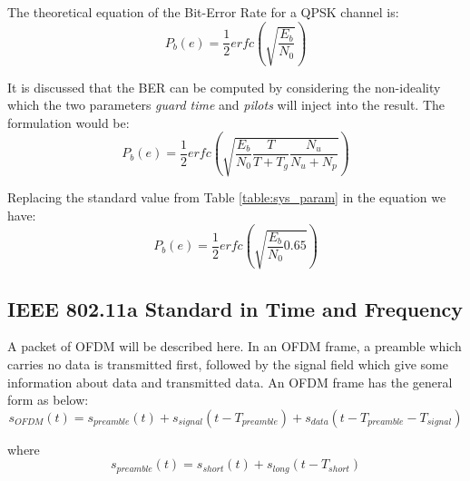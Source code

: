 The theoretical equation of the Bit-Error Rate for a QPSK channel is:\\

\begin{equation} \label{theo_ber}
P_{b}(e)= \dfrac{1}{2}erfc(\sqrt{\dfrac{E_{b}}{N_{0}}})
\end{equation}

It is discussed that the BER can be computed by considering the non-ideality which the two parameters \textit{guard time} and \textit{pilots} will inject into the result. The formulation would be:\\

\begin{equation} \label{theo_ber_guard_pilot}
P_{b}(e)= \dfrac{1}{2}erfc(\sqrt{\dfrac{E_{b}}{N_{0}}\dfrac{T}{T+T_{g}}\dfrac{N_{u}}{N_{u}+N_{p}}})
\end{equation}

Replacing the standard value from Table \ref{table:sys_param} in the equation we have:\\

\begin{equation} \label{theo_ber_ieee}
P_{b}(e)= \dfrac{1}{2}erfc(\sqrt{\dfrac{E_{b}}{N_{0}}0.65})
\end{equation}

\subsection{IEEE 802.11a Standard in Time and Frequency}
\label{section:ieee_standard}
A packet of OFDM will be described here. In an OFDM frame, a preamble which carries no data is transmitted first, followed by the signal field which give some information about data and transmitted data. An OFDM frame has the general form as below:
\begin{equation} \label{sym_ofdm}
s_{OFDM}(t)= s_{preamble}(t)+ s_{signal}(t- T_{preamble})+ s_{data}(t- T_{preamble}- T_{signal})
\end{equation}

where\\
\begin{equation} \label{preamble_ofdm}
s_{preamble}(t)= s_{short}(t)+ s_{long}(t- T_{short})
\end{equation}

